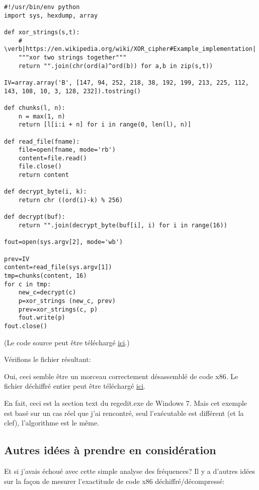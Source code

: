 \begin{lstlisting}[style=custompy]
#!/usr/bin/env python
import sys, hexdump, array

def xor_strings(s,t):
    # \verb|https://en.wikipedia.org/wiki/XOR_cipher#Example_implementation|
    """xor two strings together"""
    return "".join(chr(ord(a)^ord(b)) for a,b in zip(s,t))

IV=array.array('B', [147, 94, 252, 218, 38, 192, 199, 213, 225, 112, 143, 108, 10, 3, 128, 232]).tostring()

def chunks(l, n):
    n = max(1, n)
    return [l[i:i + n] for i in range(0, len(l), n)]

def read_file(fname):
    file=open(fname, mode='rb')
    content=file.read()
    file.close()
    return content

def decrypt_byte(i, k):
    return chr ((ord(i)-k) % 256)

def decrypt(buf):
    return "".join(decrypt_byte(buf[i], i) for i in range(16))

fout=open(sys.argv[2], mode='wb')

prev=IV
content=read_file(sys.argv[1])
tmp=chunks(content, 16)
for c in tmp:
    new_c=decrypt(c)
    p=xor_strings (new_c, prev)
    prev=xor_strings(c, p)
    fout.write(p)
fout.close()
\end{lstlisting}

(Le code source peut être téléchargé
\href{https://github.com/DennisYurichev/RE-for-beginners/blob/master/examples/simple_exec_crypto/files/decrypt2.py}
{ici}.)

Vérifions le fichier résultant:



Oui, ceci semble être un morceau correctement désassemblé de code x86.
Le fichier déchiffré entier peut être téléchargé
\href{https://github.com/DennisYurichev/RE-for-beginners/blob/master/examples/simple_exec_crypto/files/decrypted.bin}{ici}.

En fait, ceci est la section text du regedit.exe de Windows 7.
Mais cet exemple est basé sur un cas réel que j'ai rencontré, seul l'exécutable est
différent (et la clef), l'algorithme est le même.

\subsection{Autres idées à prendre en considération}

Et si j'avais échoué avec cette simple analyse des fréquences?
Il y a d'autres idées sur la façon de mesurer l'exactitude de code x86 déchiffré/décompressé:

